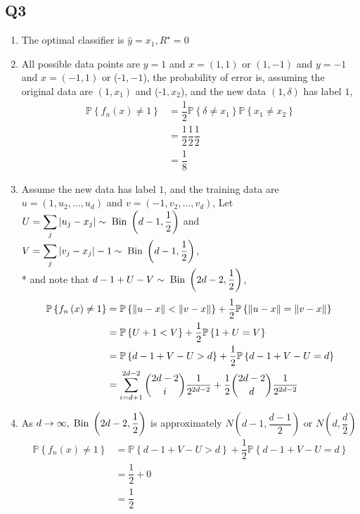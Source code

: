 \documentclass{article}
\begin{document}
\subsection{Q3}

\begin{enumerate}
\item The optimal classifier is $\hat{y} = x_{1}, R^\star  = 0$
\end{enumerate}

\begin{enumerate}
\setcounter{enumii}{1}
\item All possible data points are $y  = 1$ and $x  = \left(1, 1\right)$ or $\left(1, -1\right)$ and $y  = -1$ and $x  = \left(-1, 1\right)$ or (-$1, -1$), the probability of error is, assuming the original data are $\left(1, x_{1}\right)$ and (-$1, x_{2}$), and the new data $\left(1, \delta\right)$ has label $1$,
\begin{align*}
\mathbb{P}\left\{f_{n}\left(x\right) \neq  1\right\} &= \dfrac{1}{2} \mathbb{P}\left\{\delta \neq  x_{1}\right\} \mathbb{P}\left\{x_{1} \neq  x_{2}\right\}
\\ &= \dfrac{1}{2} \dfrac{1}{2} \dfrac{1}{2}
\\ &= \dfrac{1}{8}
\end{align*}
\item Assume the new data has label $1$, and the training data are $u  = \left(1, u_{2}, ..., u_{d}\right)$ and $v  = \left(-1, v_{2}, ..., v_{d}\right)$,
Let $U  = \displaystyle\sum_{j} |u_{j} - x_{j}| \sim  \text{\;Bin\;} \left(d - 1, \dfrac{1}{2}\right)$ and $V  = \displaystyle\sum_{j} |v_{j} - x_{j}| - 1 \sim  \text{\;Bin\;} \left(d - 1, \dfrac{1}{2}\right)$,
\\* and note that $d  - 1 + U - V \sim  \text{\;Bin\;} \left(2 d - 2, \dfrac{1}{2}\right)$,
\begin{align*}
\mathbb{P}\left\{f_{n}\left(x\right) \neq  1\right\} &= \mathbb{P}\left\{\left\|u - x\right\| < \left\|v - x\right\|\right\} + \dfrac{1}{2} \mathbb{P}\left\{\left\|u - x\right\| = \left\|v - x\right\|\right\}
\\ &= \mathbb{P}\left\{U + 1 < V\right\} + \dfrac{1}{2} \mathbb{P}\left\{1 + U = V\right\}
\\ &= \mathbb{P}\left\{d - 1 + V - U > d\right\} + \dfrac{1}{2} \mathbb{P}\left\{d - 1 + V - U = d\right\}
\\ &= \displaystyle\sum_{i=d+1}^{2d-2} \dbinom{2 d - 2}{i} \dfrac{1}{2^{2d-2}} + \dfrac{1}{2} \dbinom{2 d - 2}{d} \dfrac{1}{2^{2d-2}}
\end{align*}
\item As $d  \to  \infty, \text{\;Bin\;} \left(2 d - 2, \dfrac{1}{2}\right)$ is approximately $N\left(d - 1, \dfrac{d - 1}{2}\right) $ or $N\left(d, \dfrac{d}{2}\right) $
\begin{align*}
\mathbb{P}\left\{f_{n}\left(x\right) \neq  1\right\} &= \mathbb{P}\left\{d - 1 + V - U > d\right\} + \dfrac{1}{2} \mathbb{P}\left\{d - 1 + V - U = d\right\}
\\ &= \dfrac{1}{2} + 0
\\ &= \dfrac{1}{2}
\end{align*}
\end{enumerate}
\end{document}

